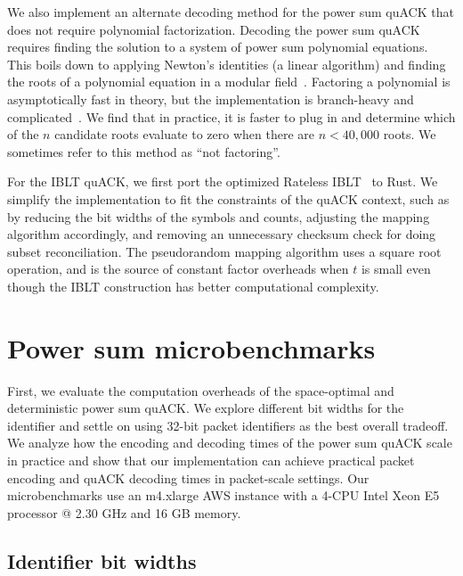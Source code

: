 
We also implement an alternate decoding method for the power sum quACK that
does not require polynomial factorization.
Decoding the power sum quACK requires finding the solution to a system of power
sum polynomial equations. This boils down to applying Newton's identities (a
linear algorithm) and finding the roots of a polynomial equation in a modular
field~\cite{eppstein2011straggler}.
Factoring a polynomial is asymptotically fast in theory, but the implementation
is branch-heavy and complicated~\cite{parigp2018}.
We find that in practice, it is faster to plug in and determine which of the
$n$ candidate roots evaluate to zero when there are $n < 40,000$ roots.
We sometimes refer to this method as ``not factoring''.

For the IBLT quACK, we first port the optimized Rateless IBLT~\cite{riblt-github}
to Rust. We simplify the implementation to fit the constraints of the quACK
context, such as by reducing the bit widths of the symbols and counts,
adjusting the mapping algorithm accordingly, and removing an unnecessary
checksum check for doing subset reconciliation. The pseudorandom mapping
algorithm uses a square root operation, and is the source of constant factor
overheads when $t$ is small even though the IBLT construction has better
computational complexity.

\section{Power sum microbenchmarks}
\label{sec:quack:psum-microbenchmarks}

First, we evaluate the computation overheads of the space-optimal and
deterministic power sum quACK. We explore different bit widths for the
identifier and settle on using 32-bit packet identifiers as the best overall
tradeoff. We analyze how the encoding and decoding times of the power sum
quACK scale in practice and show that our implementation can achieve practical
packet encoding and quACK decoding times in packet-scale settings.
Our microbenchmarks use an m4.xlarge AWS instance with a 4-CPU Intel Xeon E5
processor @ 2.30 GHz and 16 GB memory.

\subsection{Identifier bit widths}
\label{sec:quack:psum-microbenchmarks:bit-widths}

